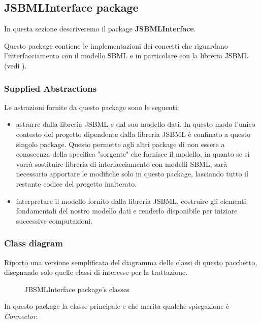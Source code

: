 
\subsection{JSBMLInterface package}

In questa sezione descriveremo il package \textbf{JSBMLInterface}.

Questo package contiene le implementazioni dei concetti che riguardano
l'interfacciamento con il modello SBML e in particolare con la
libreria JSBML (vedi \cite{JSbmlDistribution}). 

\subsubsection*{Supplied Abstractions}

Le astrazioni fornite da questo package sono le seguenti:
\begin{itemize}
\item astrarre dalla libreria JSBML e dal suo modello dati. In questo
  modo l'unico contesto del progetto dipendente dalla libreria JSBML
  \`e confinato a questo singolo package. Questo permette agli altri
  package di non essere a conoscenza della specifica "sorgente" che
  fornisce il modello, in quanto se si vorr\`a sostituire libreria di
  interfacciamento con modelli SBML, sar\`a necessario apportare le
  modifiche solo in questo package, lasciando tutto il restante codice
  del progetto inalterato.
\item interpretare il modello fornito dalla libreria JSBML, costruire
  gli elementi fondamentali del nostro modello dati e renderlo
  disponibile per iniziare successive computazioni.
\end{itemize}

\subsubsection*{Class diagram}

Riporto una versione semplificata del diagramma delle classi di questo
pacchetto, disegnando solo quelle classi di interesse per la
trattazione.
\begin{figure}
  \centering
  \caption{JBSMLInterface package's classes}
  \label{fig:JSBMLInterface-ClassDiagram}
\end{figure}

In questo package la classe principale e che merita qualche
spiegazione \`e \emph{Connector}.

